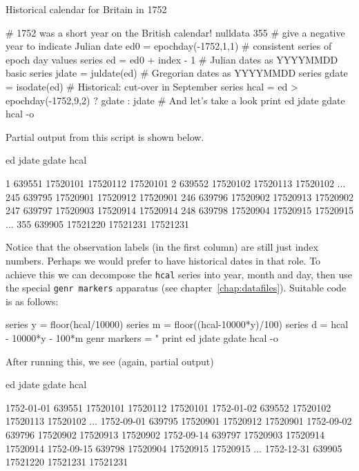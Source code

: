 \begin{script}[htbp]
  \caption{Historical calendar for Britain in 1752}
  \label{ex:britain-1752}
\begin{scode}
# 1752 was a short year on the British calendar!
nulldata 355
# give a negative year to indicate Julian date
ed0 = epochday(-1752,1,1)
# consistent series of epoch day values
series ed = ed0 + index - 1
# Julian dates as YYYYMMDD basic
series jdate = juldate(ed)
# Gregorian dates as YYYYMMDD
series gdate = isodate(ed)
# Historical: cut-over in September
series hcal = ed > epochday(-1752,9,2) ? gdate : jdate
# And let's take a look
print ed jdate gdate hcal -o
\end{scode}
\end{script}

Partial output from this script is shown below.
%
\begin{code}
              ed        jdate        gdate         hcal

  1       639551     17520101     17520112     17520101
  2       639552     17520102     17520113     17520102
...
245       639795     17520901     17520912     17520901
246       639796     17520902     17520913     17520902
247       639797     17520903     17520914     17520914
248       639798     17520904     17520915     17520915
...
355       639905     17521220     17521231     17521231
\end{code}

Notice that the observation labels (in the first column) are still
just index numbers. Perhaps we would prefer to have historical dates
in that role. To achieve this we can decompose the \texttt{hcal}
series into year, month and day, then use the special \texttt{genr
  markers} apparatus (see chapter~\ref{chap:datafiles}). Suitable
code is as follows:
\begin{code}
series y = floor(hcal/10000)
series m = floor((hcal-10000*y)/100)
series d = hcal - 10000*y - 100*m
genr markers = "%
print ed jdate gdate hcal -o
\end{code}

After running this, we see (again, partial output)
%
\begin{code}
                     ed        jdate        gdate         hcal

1752-01-01       639551     17520101     17520112     17520101
1752-01-02       639552     17520102     17520113     17520102
...
1752-09-01       639795     17520901     17520912     17520901
1752-09-02       639796     17520902     17520913     17520902
1752-09-14       639797     17520903     17520914     17520914
1752-09-15       639798     17520904     17520915     17520915
...
1752-12-31       639905     17521220     17521231     17521231
\end{code}
